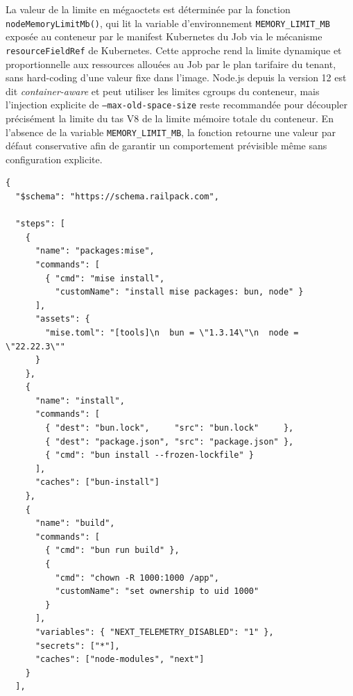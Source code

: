 La valeur de la limite en mégaoctets est déterminée par la fonction \texttt{nodeMemoryLimitMb()}, qui lit la variable d'environnement \texttt{MEMORY\_LIMIT\_MB} exposée au conteneur par le manifest Kubernetes du Job via le mécanisme \texttt{resourceFieldRef} de Kubernetes. Cette approche rend la limite dynamique et proportionnelle aux ressources allouées au Job par le plan tarifaire du tenant, sans hard-coding d'une valeur fixe dans l'image. Node.js depuis la version 12 est dit \textit{container-aware} et peut utiliser les limites cgroups du conteneur, mais l'injection explicite de \texttt{--max-old-space-size} reste recommandée pour découpler précisément la limite du tas V8 de la limite mémoire totale du conteneur.  En l'absence de la variable \texttt{MEMORY\_LIMIT\_MB}, la fonction retourne une valeur par défaut conservative afin de garantir un comportement prévisible même sans configuration explicite.
\begin{longlisting}
\begin{mdframed}[
  linecolor=gray!40,
  backgroundcolor=gray!5,
  linewidth=0.5pt,
  innerleftmargin=6pt,
  innerrightmargin=6pt,
  innertopmargin=6pt,
  innerbottommargin=6pt,
  nobreak=false
]
\begin{verbatim}
{
  "$schema": "https://schema.railpack.com",

  "steps": [
    {
      "name": "packages:mise",
      "commands": [
        { "cmd": "mise install",
          "customName": "install mise packages: bun, node" }
      ],
      "assets": {
        "mise.toml": "[tools]\n  bun = \"1.3.14\"\n  node = \"22.22.3\""
      }
    },
    {
      "name": "install",
      "commands": [
        { "dest": "bun.lock",     "src": "bun.lock"     },
        { "dest": "package.json", "src": "package.json" },
        { "cmd": "bun install --frozen-lockfile" }
      ],
      "caches": ["bun-install"]
    },
    {
      "name": "build",
      "commands": [
        { "cmd": "bun run build" },
        {
          "cmd": "chown -R 1000:1000 /app",
          "customName": "set ownership to uid 1000"
        }
      ],
      "variables": { "NEXT_TELEMETRY_DISABLED": "1" },
      "secrets": ["*"],
      "caches": ["node-modules", "next"]
    }
  ],
\end{verbatim}
\end{mdframed}
\caption{Extrait du plan \texttt{railpack-plan.json} -- Partie 1 : etapes de build}
\label{lst:railpack-plan-1}
\end{longlisting}

